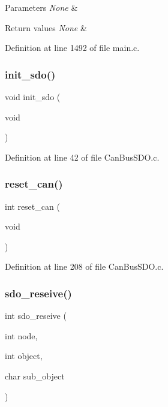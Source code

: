 \begin{DoxyParams}{Parameters}
{\em None} & \\
\hline
\end{DoxyParams}

\begin{DoxyRetVals}{Return values}
{\em None} & \\
\hline
\end{DoxyRetVals}


Definition at line 1492 of file main.\+c.

\mbox{\label{_can_bus_s_d_o_8c_a87fc19cbb8a9e65a095afdc9f03db6c6}} 
\subsubsection{init\+\_\+sdo()}
{\footnotesize\ttfamily void init\+\_\+sdo (\begin{DoxyParamCaption}\item[{void}]{ }\end{DoxyParamCaption})}



Definition at line 42 of file Can\+Bus\+S\+D\+O.\+c.

\mbox{\label{_can_bus_s_d_o_8c_a5a392245f62ad9b5c3a378af626249b1}} 
\subsubsection{reset\+\_\+can()}
{\footnotesize\ttfamily int reset\+\_\+can (\begin{DoxyParamCaption}\item[{void}]{ }\end{DoxyParamCaption})}



Definition at line 208 of file Can\+Bus\+S\+D\+O.\+c.

\mbox{\label{_can_bus_s_d_o_8c_a6b768675f6e34d26d3ee6628c86e1c65}} 
\subsubsection{sdo\+\_\+reseive()}
{\footnotesize\ttfamily int sdo\+\_\+reseive (\begin{DoxyParamCaption}\item[{int}]{node,  }\item[{int}]{object,  }\item[{char}]{sub\+\_\+object }\end{DoxyParamCaption})}



